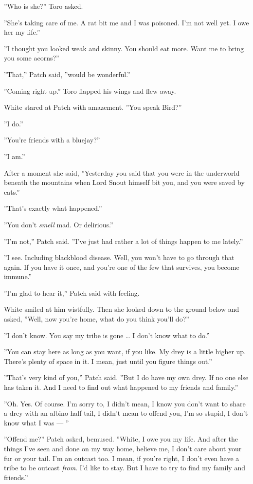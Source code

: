\documentclass[12pt]{book}
\begin{document}
''Who is she?'' Toro asked.

''She's taking care of me. A rat bit me and I was poisoned. I'm not well yet. I owe her my life.''

''I thought you looked weak and skinny. You should eat more. Want me to bring you some acorns?''

''That,'' Patch said, ''would be wonderful.''

''Coming right up.'' Toro flapped his wings and flew away.

White stared at Patch with amazement. ''You speak Bird?''

''I do.''

''You're friends with a bluejay?''

''I am.''

After a moment she said, ''Yesterday you said that you were in the underworld beneath the mountains when Lord Snout himself bit you, and you were saved by cats.''

''That's exactly what happened.''

''You don't {\it smell} mad. Or delirious.''

''I'm not,'' Patch said. ''I've just had rather a lot of things happen to me lately.''

''I see. Including blackblood disease. Well, you won't have to go through that again. If you have it once, and you're one of the few that survives, you become immune.''

''I'm glad to hear it,'' Patch said with feeling.

White smiled at him wistfully. Then she looked down to the ground below and asked, ''Well, now you're home, what do you think you'll do?''

''I don't know. You say my tribe is gone \ldots{}
I don't know what to do.''

''You can stay here as long as you want, if you like. My drey is a little higher up. There's plenty of space in it. I mean, just until you figure things out.''

''That's very kind of you,'' Patch said. ''But I do have my own drey. If no one else has taken it. And I need to find out what happened to my friends and family.''

''Oh. Yes. Of course. I'm sorry to, I didn't mean, I know you don't want to share a drey with an albino half-tail, I didn't mean to offend you, I'm so stupid, I don't know what I was ---
''

''Offend me?'' Patch asked, bemused. ''White, I owe you my life. And after the things I've seen and done on my way home, believe me, I don't care about your fur or your tail. I'm an outcast too. I mean, if you're right, I don't even have a tribe to be outcast {\it from}. I'd like to stay. But I have to try to find my family and friends.''
\end{document}
